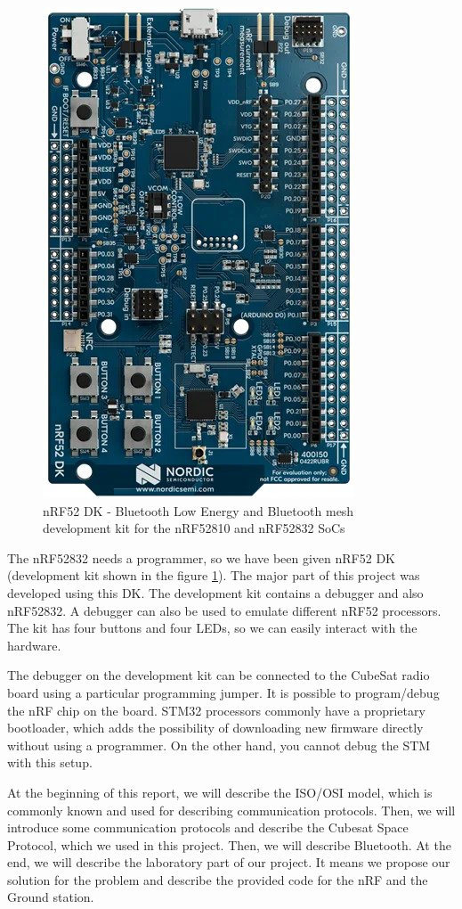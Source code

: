 \documentclass[conference]{IEEEtran}
\begin{document}
\begin{figure}[htbp]
\centerline{\includegraphics[scale=0.4]{images/nRF52-DK}}
\caption{nRF52 DK - Bluetooth Low Energy and Bluetooth mesh development kit for the nRF52810 and nRF52832 SoCs\cite{nrf-dk-shop}}
\label{nrfDK}
\end{figure}

The nRF52832 needs a programmer, so we have been given nRF52 DK \cite{nrf-dk-shop} (development kit shown in the figure \ref{nrfDK}). The major part of this project was developed using this DK. The development kit contains a debugger and also nRF52832. A debugger can also be used to emulate different nRF52 processors. The kit has four buttons and four LEDs, so we can easily interact with the hardware.

The debugger on the development kit can be connected to the CubeSat radio board using a particular programming jumper. It is possible to program/debug the nRF chip on the board. STM32 processors commonly have a proprietary bootloader, which adds the possibility of downloading new firmware directly without using a programmer. On the other hand, you cannot debug the STM with this setup.

At the beginning of this report, we will describe the ISO/OSI model, which is commonly known and used for describing communication protocols. Then, we will introduce some communication protocols and describe the Cubesat Space Protocol, which we used in this project. Then, we will describe Bluetooth. At the end, we will describe the laboratory part of our project. It means we propose our solution for the problem and describe the provided code for the nRF and the Ground station.
\end{document}
